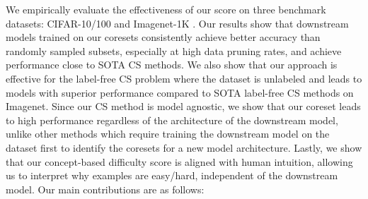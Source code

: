 We empirically evaluate the effectiveness of our score on three benchmark datasets: CIFAR-10/100 \cite{krizhevsky2009learning} and Imagenet-1K \cite{deng2009imagenet}.
Our results show that downstream models trained on our coresets consistently achieve better accuracy than randomly sampled subsets, especially at high data pruning rates, and achieve performance close to SOTA CS methods. %
We also show that our approach is effective for the label-free CS problem where the dataset is unlabeled and leads to models with superior performance compared to SOTA label-free CS methods on Imagenet.
Since our CS method is model agnostic, we show that our coreset leads to high performance regardless of the architecture of the downstream model, unlike other methods which require training the downstream model on the dataset first to identify the coresets for a new model architecture. 
Lastly, we show that our concept-based difficulty score is aligned with human intuition, allowing us to interpret why examples are easy/hard, independent of the downstream model. 
Our main contributions are as follows:
\vspace{-0.15cm}

